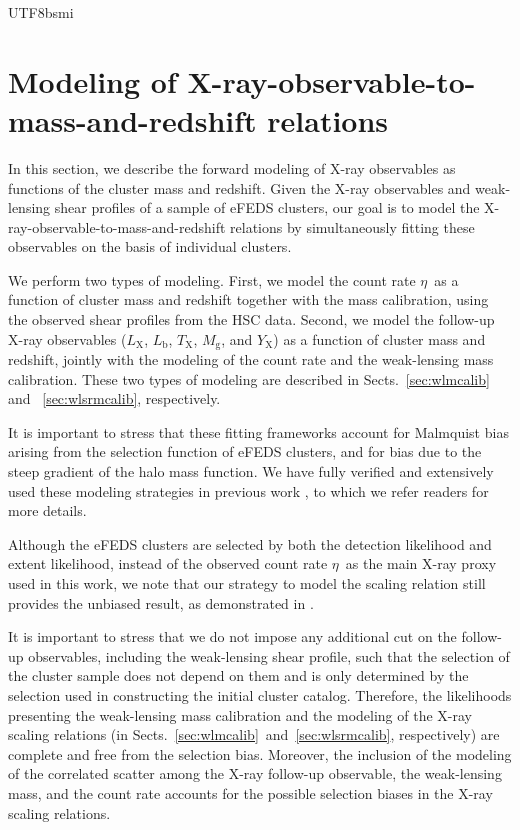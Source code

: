 \documentclass[longauth]{aa}
\newcommand{\Lx}{\ensuremath{L_{\mathrm{X}}}}
\newcommand{\Lb}{\ensuremath{L_{\mathrm{b}}}}
\newcommand{\Tx}{\ensuremath{T_{\mathrm{X}}}}
\newcommand{\Yx}{\ensuremath{Y_{\mathrm{X}}}}
\newcommand{\Mg}{\ensuremath{M_{\mathrm{g}}}}
\newcommand{\rate}{\ensuremath{\eta}}
\begin{document}
\begin{CJK*}{UTF8}{bsmi}
%
%

\section{Modeling of X-ray-observable-to-mass-and-redshift relations}
\label{sec:xtom_modeling}

In this section, we describe the forward modeling of X-ray observables as functions of the cluster mass and redshift.
Given the X-ray observables and weak-lensing shear profiles of a sample of eFEDS clusters, our goal is to model the X-ray-observable-to-mass-and-redshift relations by simultaneously fitting these observables on the basis of individual clusters.

We perform two types of modeling.
First, we model the count rate \rate\ as a function of cluster mass and redshift together with the mass calibration, using the observed shear profiles from the HSC data.
Second, we 
model the follow-up X-ray observables (\Lx, \Lb, \Tx, \Mg, and \Yx) as a function of cluster mass and redshift, jointly with the modeling of the count rate and the weak-lensing mass calibration.
These two types of modeling are described in Sects.~\ref{sec:wlmcalib} and ~\ref{sec:wlsrmcalib}, respectively.

It is important to stress that these fitting frameworks account for Malmquist bias arising from the selection function of eFEDS clusters, and for \citet{eddington13} bias due to the steep gradient of the halo mass function.
We have fully verified and extensively used these modeling strategies in previous work \citep{bocquet15,liu15a,chiu16c,chiu18a,bulbul19,bocquet19,chiu20,chiu20b,schrabback21}, to which we refer readers for more details.

Although the eFEDS clusters are selected by both the detection likelihood and extent likelihood, instead of the observed count rate \rate\ as the main X-ray proxy used in this work, we note that our strategy to model the scaling relation still provides the unbiased result, as demonstrated in \cite{grandis20}.

It is important to stress that we do not impose any additional cut on the follow-up observables, including the weak-lensing shear profile, such that the selection of the cluster sample does not depend on them and is only determined by the selection used in constructing the initial cluster catalog.
Therefore, the likelihoods presenting the weak-lensing mass calibration and the modeling of the X-ray scaling relations (in Sects.~\ref{sec:wlmcalib}~and~\ref{sec:wlsrmcalib}, respectively) are complete and free from the selection bias.
Moreover, the inclusion of the modeling of the correlated scatter among the X-ray follow-up observable, the weak-lensing mass, and the count rate accounts for the possible selection biases in the X-ray scaling relations.


\end{CJK*}
\end{document}
